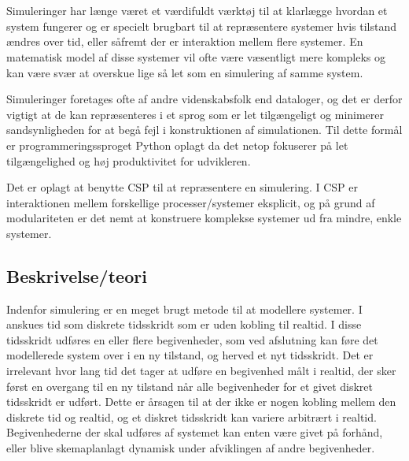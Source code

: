 \chapter{\Des}

Simuleringer har længe været et værdifuldt værktøj til at klarlægge hvordan et 
system fungerer og er specielt brugbart til at repræsentere systemer hvis 
tilstand ændres over tid, eller såfremt der er interaktion mellem flere systemer. En 
matematisk model af disse systemer vil ofte være væsentligt mere kompleks og 
kan være svær at overskue lige så let som en simulering af samme system. 

Simuleringer foretages ofte af andre videnskabsfolk end dataloger, og det er 
derfor vigtigt at de kan repræsenteres i et sprog som er let tilgængeligt og 
minimerer sandsynligheden for at begå fejl i konstruktionen af simulationen.  
Til dette formål er programmeringssproget Python oplagt da det netop fokuserer 
på let tilgængelighed og høj produktivitet for udvikleren. 

Det er oplagt at benytte CSP\cite{hoare-csp} til at repræsentere en simulering.  
I CSP er interaktionen mellem forskellige processer/systemer eksplicit, og på 
grund af modulariteten er det nemt at konstruere komplekse systemer ud fra 
mindre, enkle systemer. 

\section{Beskrivelse/teori} \label{sec:des-teori}


Indenfor simulering er \des en meget brugt metode til at modellere systemer. I 
\des anskues tid som diskrete tidsskridt som er uden kobling til realtid. I 
disse tidsskridt udføres en eller flere begivenheder, som ved afslutning kan 
føre det modellerede system over i en ny tilstand, og herved et nyt tidsskridt. 
Det er irrelevant hvor lang tid det tager at udføre en begivenhed målt i 
realtid, der sker først en overgang til en ny tilstand når alle begivenheder 
for et givet diskret tidsskridt er udført. Dette er årsagen til at der ikke er 
nogen kobling mellem den diskrete tid og realtid, og et diskret tidsskridt kan 
variere arbitrært i realtid. Begivenhederne der skal udføres af systemet kan 
enten være givet på forhånd, eller blive skemaplanlagt dynamisk under afviklingen 
af andre begivenheder. 



